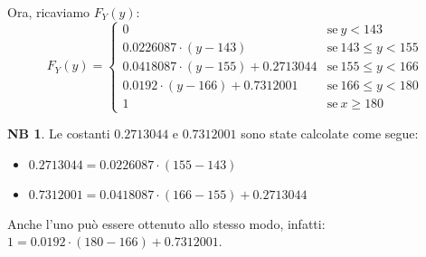 \documentclass[12pt, a4paper]{report}
\theoremstyle{definition}
\newtheorem*{note}{NB}
\begin{document}
Ora, ricaviamo $F_Y(y)$:
\[F_Y(y)=\begin{cases}
	{0} & \text{se}\ {y < 143}\\
	{0.0226087\cdot (y-143)} & \text{se}\ {143\leq y < 155}\\
	{0.0418087\cdot (y-155)+0.2713044} & \text{se} \ {155\leq y <166}\\
	{0.0192\cdot (y-166)+0.7312001} & \text{se}\ {166\leq y<180}\\
	{1} & \text{se}\ {x\geq 180}
\end{cases}\]
\begin{note}
	Le costanti $0.2713044$ e $0.7312001$ sono state calcolate come segue:
	\begin{itemize}
		\item \(0.2713044=0.0226087\cdot (155-143)\)
		\item \(0.7312001=0.0418087\cdot (166-155)+0.2713044\)
	\end{itemize}
	Anche l'uno può essere ottenuto allo stesso modo, infatti: \(1=0.0192\cdot 
	(180-166)+0.7312001\).
\end{note}
\end{document}

